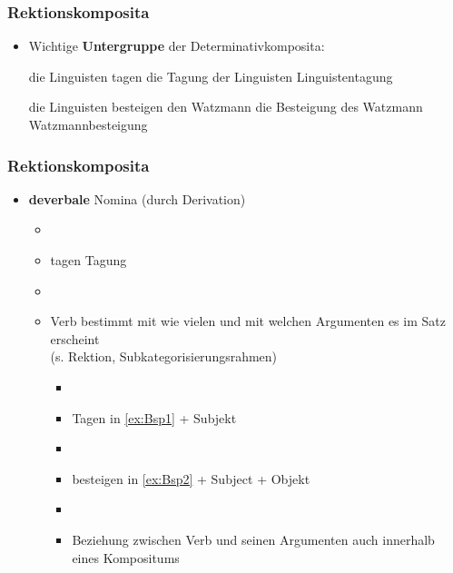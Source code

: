 

\begin{frame}
\frametitle{Rektionskomposita}

\begin{itemize}
	\item Wichtige \textbf{Untergruppe} der Determinativkomposita:
	
	\eal \label{ex:Bsp1} 
        \ex die Linguisten tagen
        \ex die Tagung der Linguisten
        \ex Linguistentagung
	\zl
	
	\eal \label{ex:Bsp2} 
        \ex die Linguisten besteigen den Watzmann
        \ex die Besteigung des Watzmann
        \ex Watzmannbesteigung
	\zl
		 
\end{itemize}


\end{frame}


\begin{frame}
\frametitle{Rektionskomposita}

\begin{itemize}
	\item \textbf{deverbale} Nomina (durch Derivation)
	
	\begin{itemize}
		\item[]
		\item tagen \ras Tagung
		\item[]
		\item Verb bestimmt mit wie vielen und mit welchen Argumenten es im Satz erscheint\\
                  (s. Rektion, Subkategorisierungsrahmen)
		
		\begin{itemize}
			\item[]
			\item Tagen in \ref{ex:Bsp1} + Subjekt
			\item[]
			\item besteigen in \ref{ex:Bsp2} + Subject + Objekt
			\item[]
			\item Beziehung zwischen Verb und seinen Argumenten auch innerhalb eines Kompositums
		\end{itemize}
	\end{itemize}
\end{itemize}


\end{frame}


